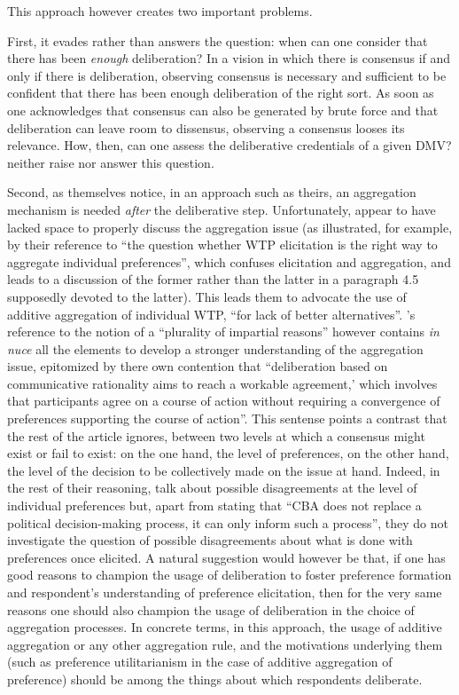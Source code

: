 \documentclass[version=last, pagesize, twoside=off, bibliography=totoc, DIV=calc, fontsize=14pt, a4paper, french, english]{scrartcl}
\begin{document}
This approach however creates two important problems.

First, it evades rather than answers the question: when can one consider that there has been \emph{enough} deliberation? In a vision in which there is consensus if and only if there is deliberation, observing consensus is necessary and sufficient to be confident that there has been enough deliberation of the right sort. As soon as one acknowledges that consensus can also be generated by brute force and that deliberation can leave room to dissensus, observing a consensus looses its relevance. How, then, can one assess the deliberative credentials of a given DMV? \citet{bartkowski_beyond_2018} neither raise nor answer this question.

Second, as \citet{bartkowski_beyond_2018} themselves notice, in an approach such as theirs, an aggregation mechanism is needed \emph{after} the deliberative step. Unfortunately, \citet{bartkowski_beyond_2018} appear to have lacked space to properly discuss the aggregation issue (as illustrated, for example, by their reference to ``the question whether WTP elicitation is the right way to aggregate individual preferences'', which confuses elicitation and aggregation, and leads to a discussion of the former rather than the latter in a paragraph 4.5 supposedly devoted to the latter). This leads them to advocate the use of additive aggregation of individual WTP, ``for lack of better alternatives''. \citet{bartkowski_beyond_2018}'s reference to the notion of a ``plurality of impartial reasons'' however contains \emph{in nuce} all the elements to develop a stronger understanding of the aggregation issue, epitomized by there own contention that ``deliberation based on communicative rationality aims to reach a workable agreement,’ which involves that participants agree on a course of action without requiring a convergence of preferences supporting the course of action\citep{dryzek_deliberative_2002}''. This sentense points a contrast that the rest of the article ignores, between two levels at which a consensus might exist or fail to exist: on the one hand, the level of preferences, on the other hand, the level of the decision to be collectively made on the issue at hand. Indeed, in the rest of their reasoning, \citet{bartkowski_beyond_2018} talk about possible disagreements at the level of individual preferences but, apart from stating that ``CBA  does not replace a political decision-making process, it can only inform such a process'', they do not investigate the question of possible disagreements about what is done with preferences once elicited. A natural suggestion would however be that, if one has good reasons to champion the usage of deliberation to foster preference formation and respondent's understanding of preference elicitation, then for the very same reasons one should also champion the usage of deliberation in the choice of aggregation processes. In concrete terms, in this approach, the usage of additive aggregation or any other aggregation rule, and the motivations underlying them (such as preference utilitarianism in the case of additive aggregation of preference) should be among the things about which respondents deliberate.
\end{document}

